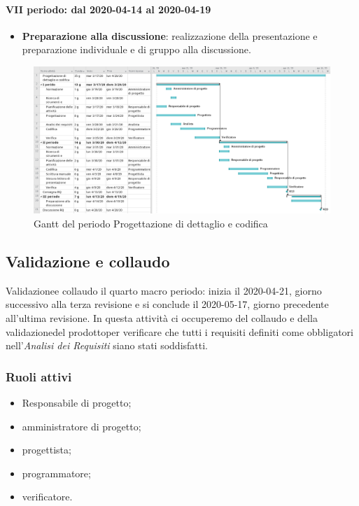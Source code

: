 \paragraph{VII periodo: dal 2020-04-14 al 2020-04-19}
\begin{itemize}
	\item \textbf{Preparazione alla discussione}: realizzazione della presentazione e preparazione individuale e di gruppo alla discussione.
\end{itemize}

\begin{landscape}
	\begin{figure}[H] 	
		\includegraphics[width=\linewidth]{./gantt/Progettazione di dettaglio e codifica.png}	
		\caption{Gantt del periodo Progettazione di dettaglio e codifica}	
	\end{figure}
\end{landscape}

\subsection{Validazione e collaudo}
Validazione\glosp e collaudo il quarto macro periodo: inizia il 2020-04-21, giorno successivo alla terza revisione e si conclude il 2020-05-17, giorno precedente all'ultima revisione. In questa attività ci occuperemo del collaudo e della validazione\glosp del prodotto\glosp per verificare che tutti i requisiti definiti come obbligatori nell'\textit{Analisi dei Requisiti} siano stati soddisfatti.

\subsubsection{Ruoli attivi}
\begin{itemize}
	\item Responsabile di progetto\glo;
	\item amministratore di progetto\glo;
	\item progettista;
	\item programmatore;
	\item verificatore.
\end{itemize}

